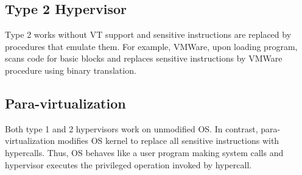\documentclass[twoside]{article}
\begin{document}
\subsection{Type 2 Hypervisor}
Type 2 works without VT support and sensitive instructions are replaced by procedures that emulate them. For example, VMWare, upon loading program, scans code for basic blocks and replaces sensitive instructions by VMWare procedure using binary translation.

\subsection{Para-virtualization}
Both type 1 and 2 hypervisors work on unmodified OS. In contrast, para-virtualization modifies OS kernel to replace all sensitive instructions with hypercalls. Thus, OS behaves like a user program making system calls and hypervisor executes the privileged operation invoked by hypercall.
\end{document}
